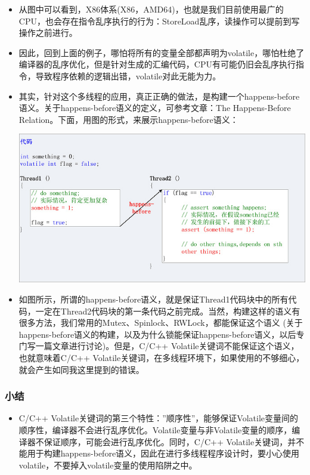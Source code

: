 \documentclass[9pt,b5paper]{article}
\begin{document}
\begin{itemize}
\item 从图中可以看到，X86体系(X86，AMD64)，也就是我们目前使用最广的CPU，也会存在指令乱序执行的行为：StoreLoad乱序，读操作可以提前到写操作之前进行。
\item 因此，回到上面的例子，哪怕将所有的变量全部都声明为volatile，哪怕杜绝了编译器的乱序优化，但是针对生成的汇编代码，CPU有可能仍旧会乱序执行指令，导致程序依赖的逻辑出错，volatile对此无能为力。
\item 其实，针对这个多线程的应用，真正正确的做法，是构建一个happens-before语义。关于happens-before语义的定义，可参考文章：The Happens-Before Relation。下面，用图的形式，来展示happens-before语义：

\includegraphics[width=.9\linewidth]{../pic/v11.jpg}

\item 如图所示，所谓的happens-before语义，就是保证Thread1代码块中的所有代码，一定在Thread2代码块的第一条代码之前完成。当然，构建这样的语义有很多方法，我们常用的Mutex、Spinlock、RWLock，都能保证这个语义 (关于happens-before语义的构建，以及为什么锁能保证happens-before语义，以后专门写一篇文章进行讨论)。但是，C/C++ Volatile关键词不能保证这个语义，也就意味着C/C++ Volatile关键词，在多线程环境下，如果使用的不够细心，就会产生如同我这里提到的错误。
\end{itemize}
\subsubsection{小结}
\label{sec-8-3-5}
\begin{itemize}
\item C/C++ Volatile关键词的第三个特性：”顺序性”，能够保证Volatile变量间的顺序性，编译器不会进行乱序优化。Volatile变量与非Volatile变量的顺序，编译器不保证顺序，可能会进行乱序优化。同时，C/C++ Volatile关键词，并不能用于构建happens-before语义，因此在进行多线程程序设计时，要小心使用volatile，不要掉入volatile变量的使用陷阱之中。
\end{itemize}
\end{document}

